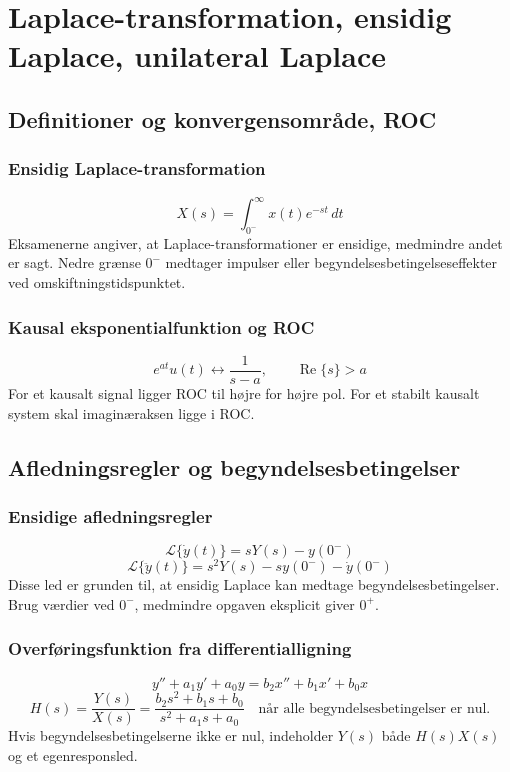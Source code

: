 \section{Laplace-transformation, ensidig Laplace, unilateral Laplace}

\subsection{Definitioner og konvergensområde, ROC}

\subsubsection{Ensidig Laplace-transformation}
\[
X(s)=\int_{0^-}^{\infty}x(t)e^{-st}\,dt
\]
Eksamenerne angiver, at Laplace-transformationer er ensidige, medmindre andet er sagt. Nedre grænse \(0^-\) medtager impulser eller begyndelsesbetingelseseffekter ved omskiftningstidspunktet.

\subsubsection{Kausal eksponentialfunktion og ROC}
\[
e^{at}u(t)\leftrightarrow \frac{1}{s-a},\qquad \operatorname{Re}\{s\}>a
\]
For et kausalt signal ligger ROC til højre for højre pol. For et stabilt kausalt system skal imaginæraksen ligge i ROC.

\subsection{Afledningsregler og begyndelsesbetingelser}

\subsubsection{Ensidige afledningsregler}
\[
\mathcal{L}\{\dot y(t)\}=sY(s)-y(0^-)
\]
\[
\mathcal{L}\{\ddot y(t)\}=s^2Y(s)-s y(0^-)-\dot y(0^-)
\]
Disse led er grunden til, at ensidig Laplace kan medtage begyndelsesbetingelser. Brug værdier ved \(0^-\), medmindre opgaven eksplicit giver \(0^+\).

\subsubsection{Overføringsfunktion fra differentialligning}
\[
y''+a_1y'+a_0y=b_2x''+b_1x'+b_0x
\]
\[
H(s)=\frac{Y(s)}{X(s)}=\frac{b_2s^2+b_1s+b_0}{s^2+a_1s+a_0}
\quad\text{når alle begyndelsesbetingelser er nul.}
\]
Hvis begyndelsesbetingelserne ikke er nul, indeholder \(Y(s)\) både \(H(s)X(s)\) og et egenresponsled.

